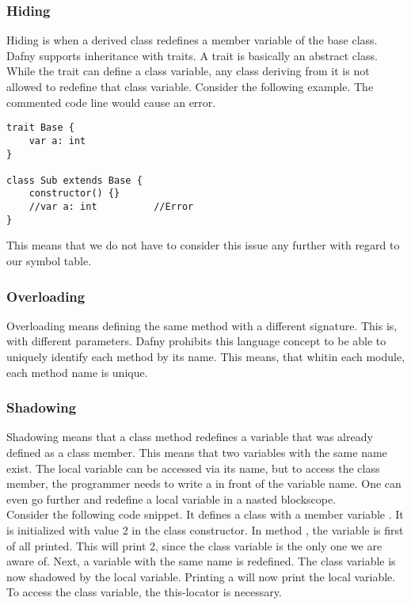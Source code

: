 \subsubsection{Hiding}
Hiding is when a derived class redefines a member variable of the base class. Dafny supports inheritance with traits. A trait is basically an abstract class. While the trait can define a class variable, any class deriving from it is not allowed to redefine that class variable. Consider the following example. The commented code line would cause an error. \cite{dafnyReferenceManual}

\begin{lstlisting}[caption={Hiding}, captionpos=b, label={lst:hiding}]
trait Base {
    var a: int
}

class Sub extends Base {
    constructor() {}
    //var a: int          //Error
}
\end{lstlisting}

This means that we do not have to consider this issue any further with regard to our symbol table.

\subsubsection{Overloading}
Overloading means defining the same method with a different signature. This is, with different parameters. Dafny prohibits this language concept to be able to uniquely identify each method by its name. \cite{dafnyReferenceManual}
This means, that whitin each module, each method name is unique.

\subsubsection{Shadowing}

Shadowing means that a class method redefines a variable that was already defined as a class member. This means that two variables with the same name exist. The local variable can be accessed via its name, but to access the class member, the programmer needs to write a  in front of the variable name. One can even go further and redefine a local variable in a nasted blockscope.\\

Consider the following code snippet. It defines a class with a member variable . It is initialized with value 2 in the class constructor. In method , the variable  is first of all printed. This will print 2, since the class variable is the only one we are aware of. Next, a variable with the same name is redefined. The class variable is now shadowed by the local variable. Printing a will now print the local variable. To access the class variable, the this-locator is necessary.

